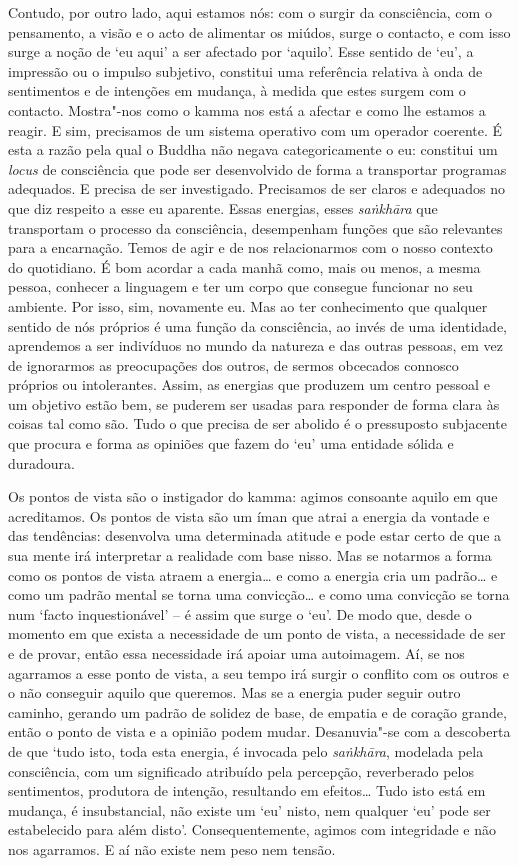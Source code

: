 Contudo, por outro lado, aqui estamos nós: com o surgir da consciência, com o
pensamento, a visão e o acto de alimentar os miúdos, surge o contacto, e com
isso surge a noção de `eu aqui' a ser afectado por `aquilo'. Esse sentido de
`eu', a impressão ou o impulso subjetivo, constitui uma referência relativa à
onda de sentimentos e de intenções em mudança, à medida que estes surgem com o
contacto. Mostra"-nos como o kamma nos está a afectar e como lhe estamos a
reagir. E sim, precisamos de um sistema operativo com um operador coerente. É
esta a razão pela qual o Buddha não negava categoricamente o eu: constitui um
\emph{locus} de consciência que pode ser desenvolvido de forma a transportar
programas adequados. E precisa de ser investigado. Precisamos de ser claros e
adequados no que diz respeito a esse eu aparente. Essas energias, esses
\emph{saṅkhāra} que transportam o processo da consciência, desempenham funções
que são relevantes para a encarnação. Temos de agir e de nos relacionarmos com o
nosso contexto do quotidiano. É bom acordar a cada manhã como, mais ou menos, a
mesma pessoa, conhecer a linguagem e ter um corpo que consegue funcionar no seu
ambiente. Por isso, sim, novamente eu. Mas ao ter conhecimento que qualquer
sentido de nós próprios é uma função da consciência, ao invés de uma identidade,
aprendemos a ser indivíduos no mundo da natureza e das outras pessoas, em vez de
ignorarmos as preocupações dos outros, de sermos obcecados connosco próprios ou
intolerantes. Assim, as energias que produzem um centro pessoal e um objetivo
estão bem, se puderem ser usadas para responder de forma clara às coisas tal
como são. Tudo o que precisa de ser abolido é o pressuposto subjacente que
procura e forma as opiniões que fazem do `eu' uma entidade sólida e duradoura.

Os pontos de vista são o instigador do kamma: agimos consoante aquilo em que
acreditamos. Os pontos de vista são um íman que atrai a energia da vontade e das
tendências: desenvolva uma determinada atitude e pode estar certo de que a sua
mente irá interpretar a realidade com base nisso. Mas se notarmos a forma como
os pontos de vista atraem a energia\ldots{} e como a energia cria um padrão\ldots{} e como
um padrão mental se torna uma convicção\ldots{} e como uma convicção se torna num
`facto inquestionável' -- é assim que surge o `eu'. De modo que, desde o momento
em que exista a necessidade de um ponto de vista, a necessidade de ser e de
provar, então essa necessidade irá apoiar uma autoimagem. Aí, se nos agarramos a
esse ponto de vista, a seu tempo irá surgir o conflito com os outros e o não
conseguir aquilo que queremos. Mas se a energia puder seguir outro caminho,
gerando um padrão de solidez de base, de empatia e de coração grande, então o
ponto de vista e a opinião podem mudar. Desanuvia"-se com a descoberta de que
`tudo isto, toda esta energia, é invocada pelo \emph{saṅkhāra}, modelada pela
consciência, com um significado atribuído pela percepção, reverberado pelos
sentimentos, produtora de intenção, resultando em efeitos\ldots{} Tudo isto está em
mudança, é insubstancial, não existe um `eu' nisto, nem qualquer `eu' pode ser
estabelecido para além disto'. Consequentemente, agimos com integridade e não
nos agarramos. E aí não existe nem peso nem tensão.


